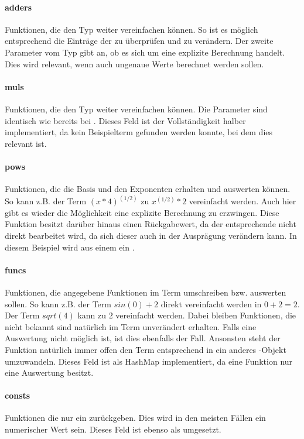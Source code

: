 \documentclass[11pt,a4paper, ngerman]{article}
\begin{document}
\paragraph{adders} Funktionen, die den Typ  weiter vereinfachen können. So ist es möglich entsprechend die Einträge der  zu überprüfen und zu verändern. Der zweite Parameter vom Typ  gibt an, ob es sich um eine explizite Berechnung handelt. Dies wird relevant, wenn auch ungenaue Werte berechnet werden sollen.

\paragraph{muls} Funktionen, die den Typ  weiter vereinfachen können. Die Parameter sind identisch wie bereits bei . Dieses Feld ist der Vollständigkeit halber implementiert, da kein Beispielterm gefunden werden konnte, bei dem dies relevant ist.

\paragraph{pows} Funktionen, die die Basis und den Exponenten erhalten und auswerten können. So kann z.B. der Term $(x*4)^{(1/2)}$ zu $x^{(1/2)}*2$ vereinfacht werden. Auch hier gibt es wieder die Möglichkeit eine explizite Berechnung zu erzwingen. Diese Funktion besitzt darüber hinaus einen Rückgabewert, da der entsprechende  nicht direkt bearbeitet wird, da sich dieser auch in der Ausprägung verändern kann. In diesem Beispiel wird aus einem  ein .

\paragraph{funcs} Funktionen, die angegebene Funktionen im Term umschreiben bzw. auswerten sollen. So kann z.B. der Term $sin(0) + 2$ direkt vereinfacht werden in $0 + 2 = 2$. Der Term $sqrt(4)$ kann zu $2$ vereinfacht werden. Dabei bleiben Funktionen, die  nicht bekannt sind natürlich im Term unverändert erhalten. Falls eine Auswertung nicht möglich ist, ist dies ebenfalls der Fall. Ansonsten steht der Funktion natürlich immer offen den Term entsprechend in ein anderes -Objekt umzuwandeln. Dieses Feld ist als HashMap implementiert, da eine Funktion nur eine Auswertung besitzt.

\paragraph{consts} Funktionen die nur ein  zurückgeben. Dies wird in den meisten Fällen ein numerischer Wert sein. Dieses Feld ist ebenso als  umgesetzt.
\end{document}
